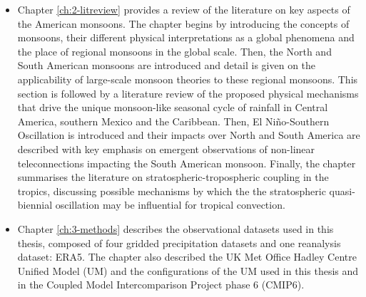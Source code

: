 \begin{itemize}
\item Chapter \ref{ch:2-litreview} provides a review of the literature on key aspects of the American monsoons. The chapter begins by introducing the concepts of monsoons, their different physical interpretations as a global phenomena and the place of regional monsoons in the global scale. Then, the North and South American monsoons are introduced and detail is given on the applicability of large-scale monsoon theories to these regional monsoons. This section is followed by a literature review of the proposed physical mechanisms that drive the unique monsoon-like seasonal cycle of rainfall in Central America, southern Mexico and the Caribbean. Then, El Niño-Southern Oscillation is introduced and their impacts over North and South America are described with key emphasis on emergent observations of non-linear teleconnections impacting the South American monsoon. Finally, the chapter summarises the literature on stratospheric-tropospheric coupling in the tropics, discussing possible mechanisms by which the the stratospheric quasi-biennial oscillation may be influential for tropical convection. 

\item  Chapter \ref{ch:3-methods} describes the observational datasets used in this thesis, composed of four gridded precipitation datasets and one reanalysis dataset: ERA5. The chapter also described the UK Met Office Hadley Centre Unified Model (UM) and the configurations of the UM used in this thesis and in the Coupled Model Intercomparison Project phase 6 (CMIP6). 


\end{itemize}
